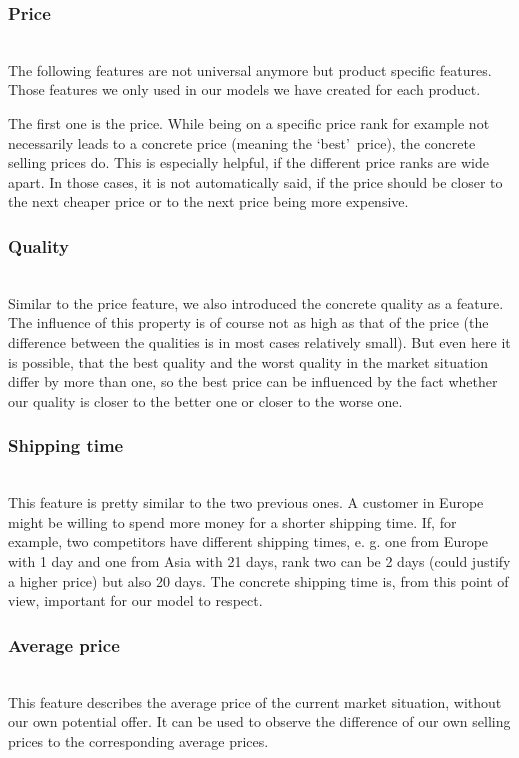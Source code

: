 	\subsubsection{Price}
		~\\
		The following features are not universal anymore but product specific features. Those features we only used in our models we have created for each product.

		The first one is the price. While being on a specific price rank for example not necessarily leads to a concrete price (meaning the \lq{best}\rq\ price), the concrete selling prices do. This is especially helpful, if the different price ranks are wide apart. In those cases, it is not automatically said, if the price should be closer to the next cheaper price or to the next price being more expensive.
	\subsubsection{Quality}
		~\\
		Similar to the price feature, we also introduced the concrete quality as a feature. The influence of this property is of course not as high as that of the price (the difference between the qualities is in most cases relatively small). But even here it is possible, that the best quality and the worst quality in the market situation differ by more than one, so the best price can be influenced by the fact whether our quality is closer to the better one or closer to the worse one.
	\subsubsection{Shipping time}
		~\\
		This feature is pretty similar to the two previous ones. A customer in Europe might be willing to spend more money for a shorter shipping time. If, for example, two competitors have different shipping times, e. g. one from Europe with 1 day and one from Asia with 21 days, rank two can be 2 days (could justify a higher price) but also 20 days. The concrete shipping time is, from this point of view, important for our model to respect.
	\subsubsection{Average price}
		~\\
		This feature describes the average price of the current market situation, without our own potential offer. It can be used to observe the difference of our own selling prices to the corresponding average prices.
